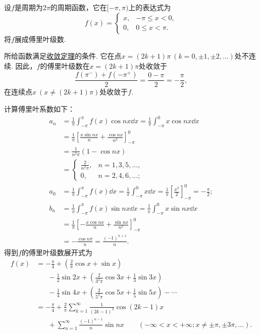 \begin{example}
设\(f\)是周期为\(2\pi\)的周期函数，它在\([-\pi,\pi)\)上的表达式为\[
f(x) = \left\{ \begin{array}{cc}
x, & -\pi \leq x < 0, \\
0, & 0 \leq x < \pi.
\end{array} \right.
\]
将\(f\)展成傅里叶级数.
\begin{solution}
所给函数满足\hyperref[theorem:无穷级数.傅里叶级数收敛的狄利克雷充分条件]{收敛定理}的条件.
它在点\(x=(2k+1)\pi\ (k=0,\pm1,\pm2,\dotsc)\)处不连续.
因此，\(f\)的傅里叶级数在\(x=(2k+1)\pi\)处收敛于\[
\frac{f(\pi^-)+f(-\pi^+)}{2} = \frac{0-\pi}{2} = -\frac{\pi}{2},
\]在连续点\(x\ (x\neq(2k+1)\pi)\)处收敛于\(f\).

计算傅里叶系数如下：\begin{align*}
	a_n &= \frac{1}{\pi} \int_{-\pi}^\pi f(x) \cos nx \dd{x}
	= \frac{1}{\pi} \int_{-\pi}^0 x \cos nx \dd{x} \\
	&= \frac{1}{\pi} \left[ \frac{x \sin nx}{n} + \frac{\cos nx}{n^2} \right]_{-\pi}^0 \\
	&= \frac{1}{n^2 \pi} (1-\cos nx) \\
	&= \left\{ \begin{array}{cc}
	\frac{2}{n^2 \pi}, & n=1,3,5,\dotsc, \\
	0, & n=2,4,6,\dotsc;
	\end{array} \right. \\
	a_0 &= \frac{1}{\pi} \int_{-\pi}^\pi f(x) \dd{x}
	= \frac{1}{\pi} \int_{-\pi}^0 x \dd{x}
	= \frac{1}{\pi} \left[ \frac{x^2}{2} \right]_{-\pi}^0 = -\frac{\pi}{2}; \\
	b_n &= \frac{1}{\pi} \int_{-\pi}^\pi f(x) \sin nx \dd{x}
	= \frac{1}{\pi} \int_{-\pi}^0 x \sin nx \dd{x} \\
	&= \frac{1}{\pi} \left[ -\frac{x \cos nx}{n} + \frac{\sin nx}{n^2} \right]_{-\pi}^0 \\
	&= -\frac{\cos n\pi}{n} = \frac{(-1)^{n+1}}{n}.
\end{align*}
得到\(f\)的傅里叶级数展开式为\begin{align*}
	f(x) &= -\frac{\pi}{4} + \left(\frac{2}{\pi} \cos x + \sin x\right) \\
	&\hspace{20pt}-\frac{1}{2}\sin 2x + \left(\frac{2}{3^2\pi}\cos 3x + \frac{1}{3}\sin 3x\right) \\
	&\hspace{20pt}-\frac{1}{4}\sin 4x + \left(\frac{2}{5^2\pi}\cos 5x + \frac{1}{5}\sin 5x\right)
	-\dotsb \\
	&= -\frac{\pi}{4} + \frac{2}{\pi} \sum_{k=1}^\infty \frac{1}{(2k-1)^2} \cos(2k-1)x \\
	&\hspace{20pt}+\sum_{n=1}^\infty \frac{(-1)^{n-1}}{n} \sin nx
		\qquad(-\infty<x<+\infty; x\neq\pm\pi,\pm3\pi,\dotsc).
\end{align*}
\end{solution}
\end{example}

